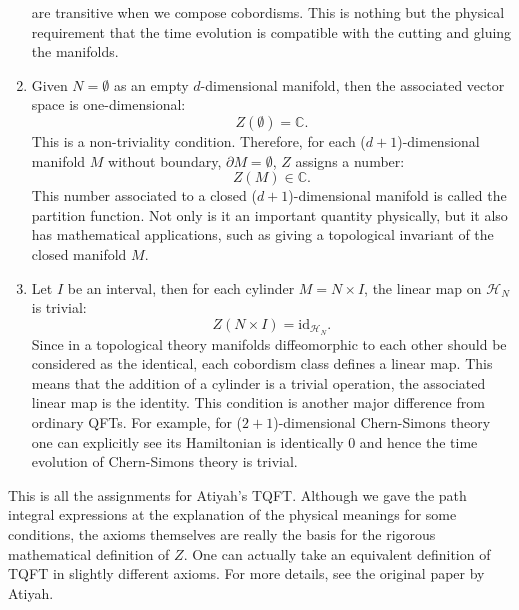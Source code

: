 \begin{enumerate}
are transitive when we compose cobordisms. This is nothing but the
physical requirement that the time evolution is compatible with the
cutting and gluing the manifolds.
  \item Given $N=\emptyset$ as an empty $d$-dimensional manifold, then the
associated vector space is one-dimensional:
\begin{equation}
  Z\left(\emptyset\right)  =  \mathbb{C}.
\end{equation}
This is a non-triviality condition. Therefore, for each ($d+1$)-dimensional
manifold $M$ without boundary, $\partial M=\emptyset$, $Z$ assigns
a number:
\begin{equation}
  Z\left(M\right)  \in  \mathbb{C}.
\end{equation}
 This number associated to a closed ($d+1$)-dimensional manifold
is called the partition function. Not only is it an important quantity
physically, but it also has mathematical applications, such as giving
a topological invariant of the closed manifold $M$.
\item Let $I$ be an interval, then for each cylinder $M=N\times I$, the
linear map on $\mathcal{H}_{N}$ is trivial:
\begin{equation}
  Z\left(N\times I\right)  =  \mathrm{id}_{\mathcal{H}_{N}}.
\end{equation}
 Since in a topological theory manifolds diffeomorphic to each other
should be considered as the identical, each cobordism class defines
a linear map. This means that the addition of a cylinder is a trivial
operation, the associated linear map is the identity. This condition
is another major difference from ordinary QFTs. For example, for ($2+1$)-dimensional
Chern-Simons theory one can explicitly see its Hamiltonian is identically
$0$ and hence the time evolution of Chern-Simons theory is trivial.
\end{enumerate}
%
This is all the assignments for Atiyah's TQFT. Although we gave the
path integral expressions at the explanation of the physical meanings
for some conditions, the axioms themselves are really the basis for
the rigorous mathematical definition of $Z$. One can actually take
an equivalent definition of TQFT in slightly different axioms. For
more details, see the original paper by Atiyah.

